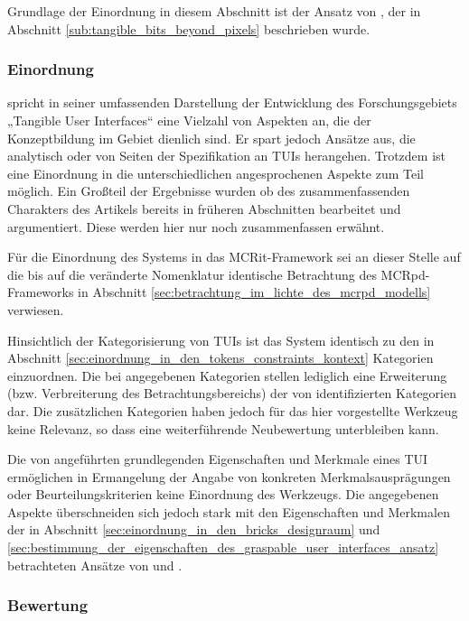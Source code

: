 Grundlage der Einordnung in diesem Abschnitt ist der Ansatz von \citet{Ishii08}, der in Abschnitt \ref{sub:tangible_bits_beyond_pixels} beschrieben wurde.

\subsubsection{Einordnung}

\citet{Ishii08} spricht in seiner umfassenden Darstellung der Entwicklung des Forschungsgebiets „Tangible User Interfaces“ eine Vielzahl von Aspekten an, die der Konzeptbildung im Gebiet dienlich sind. Er spart jedoch Ansätze aus, die analytisch oder von Seiten der Spezifikation an \glspl{TUI} herangehen. Trotzdem ist eine Einordnung in die unterschiedlichen angesprochenen Aspekte zum Teil möglich. Ein Großteil der Ergebnisse wurden ob des zusammenfassenden Charakters des Artikels bereits in früheren Abschnitten bearbeitet und argumentiert. Diese werden hier nur noch zusammenfassen erwähnt.

Für die Einordnung des Systems in das \gls{MCRit}-Framework sei an dieser Stelle auf die bis auf die veränderte Nomenklatur identische Betrachtung des \gls{MCRpd}-Frameworks in Abschnitt \ref{sec:betrachtung_im_lichte_des_mcrpd_modells} verwiesen.

Hinsichtlich der Kategorisierung von \glspl{TUI} ist das System identisch zu den in Abschnitt \ref{sec:einordnung_in_den_tokens_constraints_kontext} Kategorien einzuordnen. Die bei \citet{Ishii08} angegebenen Kategorien stellen lediglich eine Erweiterung (bzw. Verbreiterung des Betrachtungsbereichs) der von \citet{Ullmer05} identifizierten Kategorien dar. Die zusätzlichen Kategorien haben jedoch für das hier vorgestellte Werkzeug keine Relevanz, so dass eine weiterführende Neubewertung unterbleiben kann.

Die von \citeauthor{Ishii08} angeführten grundlegenden Eigenschaften und Merkmale eines \gls{TUI} ermöglichen in Ermangelung der Angabe von konkreten Merkmalsausprägungen oder Beurteilungskriterien keine Einordnung des Werkzeugs. Die angegebenen Aspekte überschneiden sich jedoch stark mit den Eigenschaften und Merkmalen der in Abschnitt \ref{sec:einordnung_in_den_bricks_designraum} und \ref{sec:bestimmung_der_eigenschaften_des_graspable_user_interfaces_ansatz} betrachteten Ansätze von \citet{Fitzmaurice95} und \citet{Fitzmaurice96}.

\subsubsection{Bewertung}

